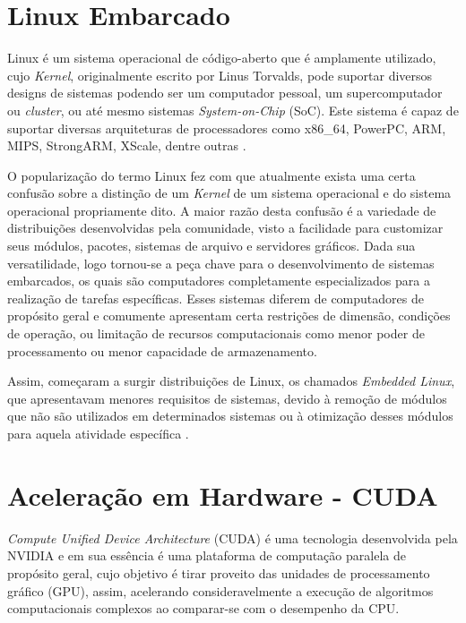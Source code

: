 \section{Linux Embarcado}

Linux é um sistema operacional de código-aberto que é amplamente utilizado, cujo \textit{Kernel}, originalmente escrito por Linus Torvalds, pode suportar diversos designs de sistemas podendo ser um computador pessoal, um supercomputador ou \textit{cluster}, ou até mesmo sistemas \textit{System-on-Chip} (SoC). Este sistema é capaz de suportar diversas arquiteturas de processadores como x86{\_}64, PowerPC, ARM, MIPS, StrongARM, XScale, dentre outras \cite{Wang2011}.

O popularização do termo Linux fez com que atualmente exista uma certa confusão sobre a distinção de um \textit{Kernel} de um sistema operacional e do sistema operacional propriamente dito. A maior razão desta confusão é a variedade de distribuições desenvolvidas pela comunidade, visto a facilidade para customizar seus módulos, pacotes, sistemas de arquivo e servidores gráficos. Dada sua versatilidade, logo tornou-se a peça chave para o desenvolvimento de sistemas embarcados, os quais são computadores completamente especializados para a realização de tarefas específicas. Esses sistemas diferem de computadores de propósito geral e comumente apresentam certa restrições de dimensão, condições de operação, ou limitação de recursos computacionais como menor poder de processamento ou menor capacidade de armazenamento. 

Assim, começaram a surgir distribuições de Linux, os chamados \textit{Embedded Linux}, que apresentavam menores requisitos de sistemas, devido à remoção de módulos que não são utilizados em determinados sistemas ou à otimização desses módulos para aquela atividade específica \cite{Yaghmour2008}.


\section{Aceleração em Hardware - CUDA}
\label{cuda}

\textit{Compute Unified Device Architecture} (CUDA) é uma tecnologia desenvolvida pela NVIDIA e em sua essência é uma plataforma de computação paralela de propósito geral, cujo objetivo é tirar proveito das unidades de processamento gráfico (GPU), assim, acelerando consideravelmente a execução de algoritmos computacionais complexos ao comparar-se com o desempenho da CPU.

